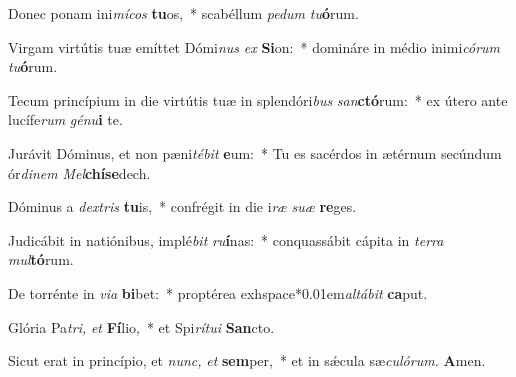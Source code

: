 \item Donec ponam ini\textit{mícos} \textbf{tu}os,~* scabéllum \textit{pedum} \textit{tu}\textbf{ó}rum.
\item Virgam virtútis tuæ emíttet Dómi\textit{nus} \textit{ex} \textbf{Si}on:~* domináre in médio inimi\textit{córum} \textit{tu}\textbf{ó}rum.
\item Tecum princípium in die virtútis tuæ in splendóri\textit{bus} \textit{san}\textbf{ctó}rum:~* ex útero ante lucífe\textit{rum} \textit{génu}\textbf{i} te.
\item Jurávit Dóminus, et non pæni\textit{tébit} \textbf{e}um:~* Tu es sacérdos in ætérnum secúndum ór\textit{dinem} \textit{Mel}\textbf{chí}\textbf{se}dech.
\item Dóminus a \textit{dextris} \textbf{tu}is,~* confrégit in die i\textit{ræ} \textit{suæ} \textbf{re}ges.
\item Judicábit in natiónibus, implé\textit{bit} \textit{ru}\textbf{í}nas:~* conquassábit cápita in \textit{terra} \textit{mul}\textbf{tó}rum.
\item De torrénte in \textit{via} \textbf{bi}bet:~* proptérea exhspace*{0.01em}\textit{altábit} \textbf{ca}put.
\item Glória Pa\tinyhspace\textit{tri,} \textit{et} \textbf{Fí}lio,~* et Spi\teenyhspace\textit{rítui} \textbf{San}cto.
\item Sicut erat in princípio, et \textit{nunc,} \textit{et} \textbf{sem}per,~* et in sǽcula sæ\tinyhspace\textit{culórum.} \textbf{A}men.